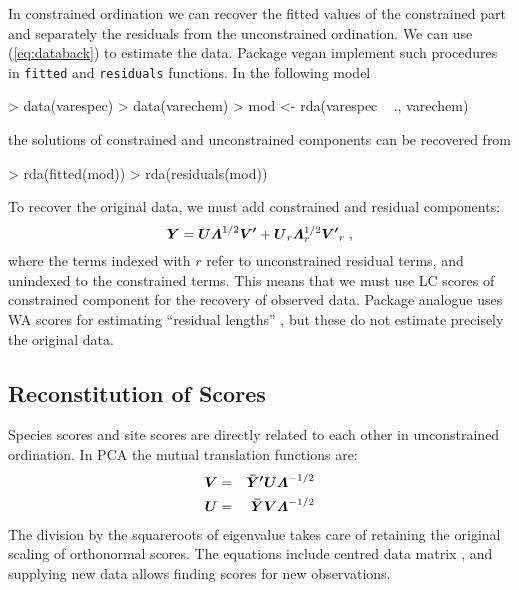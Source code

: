 In constrained ordination we can recover the fitted values of the
constrained part and separately the residuals from the unconstrained
ordination. We can use (\ref{eq:databack}) to estimate the data.
Package vegan implement such procedures in \texttt{fitted} and
\texttt{residuals} functions. In the following model

\begin{Schunk}
\begin{Sinput}
> data(varespec)
> data(varechem)
> mod <- rda(varespec ~ ., varechem)
\end{Sinput}
\end{Schunk}
the solutions of constrained and unconstrained components can be
recovered from

\begin{Schunk}
\begin{Sinput}
> rda(fitted(mod))
> rda(residuals(mod))
\end{Sinput}
\end{Schunk}

To recover the original data, we must add constrained and residual
components:
\begin{equation}
  \vec{Y} = \vec{U} \bLambda^{1/2} \vec{V'} + \vec{U}_r \vec{\bLambda}_r^{1/2} \vec{V'}_r\;,
\end{equation}
where the terms indexed with $r$ refer to unconstrained residual
terms, and unindexed to the constrained terms. This means that we must
use LC scores  of constrained component for the recovery of
observed data. Package analogue uses WA scores  for estimating
``residual lengths'' \citep[following][]{CANOCO}, but these do not
estimate precisely the original data.

\subsection{Reconstitution of Scores}

Species scores  and site scores  are directly related to
each other in unconstrained ordination. In PCA the mutual translation
functions are:
\begin{eqnarray}
 \vec{V} &=& \vec{\bar Y'} \vec{U} \bLambda^{-1/2}\\
 \vec{U} &= & \vec{\bar Y} \vec{V} \bLambda^{-1/2}
\end{eqnarray}
The division by the squareroots of eigenvalue takes care of retaining
the original scaling of orthonormal scores. The equations include
centred data matrix , and supplying new data allows
finding scores for new observations.

